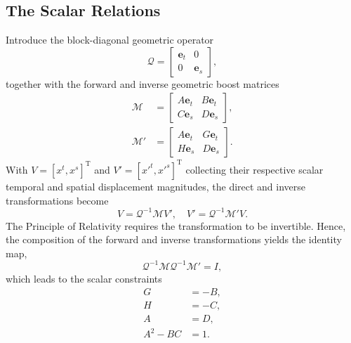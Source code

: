 \subsection{The Scalar Relations}
Introduce the block-diagonal geometric operator
\begin{equation}
    \boldsymbol{\mathcal{Q}} =
    \begin{bmatrix}
        \mathbf{e}_{t} & 0\\
        0 & \mathbf{e}_{s}
    \end{bmatrix},
\end{equation}
together with the forward and inverse geometric boost matrices
\begin{subequations}\label{eq_boost_matrices}
\begin{align}
\boldsymbol{\mathcal{M}} &=
\begin{bmatrix}
    A\mathbf{e}_{t} & B\mathbf{e}_{t}\\
    C\mathbf{e}_{s} & D\mathbf{e}_{s}
\end{bmatrix},\\
\boldsymbol{\mathcal{M}}' &=
\begin{bmatrix}
    A\mathbf{e}_{t} & G\mathbf{e}_{t}\\
    H\mathbf{e}_{s} & D\mathbf{e}_{s}
\end{bmatrix}.
\end{align}
\end{subequations}
With $V = [x^{t},x^{s}]^{\mathrm{T}}$ and $V' = [x'^{t},x'^{s}]^{\mathrm{T}}$ collecting their respective scalar temporal and spatial displacement magnitudes, the direct and inverse transformations become
\begin{equation}
    V = \boldsymbol{\mathcal{Q}}^{-1}\boldsymbol{\mathcal{M}}V',\quad V' = \boldsymbol{\mathcal{Q}}^{-1}\boldsymbol{\mathcal{M}}'V.
\end{equation}
The Principle of Relativity requires the transformation to be invertible. Hence, the composition of the forward and inverse transformations yields the identity map,
\begin{equation}
    \boldsymbol{\mathcal{Q}}^{-1}\boldsymbol{\mathcal{M}}
    \boldsymbol{\mathcal{Q}}^{-1}\boldsymbol{\mathcal{M}}' = I,
\end{equation}
which leads to the scalar constraints
\begin{subequations}\label{eq_composition_constraints}
\begin{align}
    G &= -B,\\
    H &= -C,\\
    A &= D,\label{eq_AeqD}\\
    A^{2} - BC &= 1.
\end{align}
\end{subequations}


